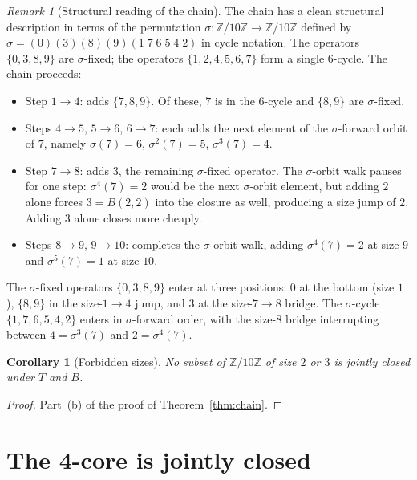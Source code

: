 \documentclass[11pt,reqno]{amsart}
\theoremstyle{plain}
\newtheorem{corollary}[theorem]{Corollary}
\theoremstyle{definition}
\theoremstyle{remark}
\newtheorem*{remark}{Remark}
\newcommand{\Z}{\mathbb{Z}}
\newcommand{\Zten}{\Z/10\Z}
\begin{document}
\begin{remark}[Structural reading of the chain]\label{rem:sigma-walk}
The chain has a clean structural description in terms of the
permutation $\sigma:\Zten\to\Zten$ defined by
$\sigma=(0)(3)(8)(9)(1\;7\;6\;5\;4\;2)$ in cycle notation. The
operators $\{0,3,8,9\}$ are $\sigma$-fixed; the operators
$\{1,2,4,5,6,7\}$ form a single $6$-cycle. The chain proceeds:
\begin{itemize}\setlength\itemsep{0pt}
\item Step $1\to 4$: adds $\{7,8,9\}$. Of these, $7$ is in the
$6$-cycle and $\{8,9\}$ are $\sigma$-fixed.
\item Steps $4\to 5$, $5\to 6$, $6\to 7$: each adds the next
element of the $\sigma$-forward orbit of $7$, namely
$\sigma(7)=6$, $\sigma^{2}(7)=5$, $\sigma^{3}(7)=4$.
\item Step $7\to 8$: adds $3$, the remaining $\sigma$-fixed
operator. The $\sigma$-orbit walk pauses for one step:
$\sigma^{4}(7)=2$ would be the next $\sigma$-orbit element, but
adding $2$ alone forces $3=B(2,2)$ into the closure as well,
producing a size jump of $2$. Adding $3$ alone closes more
cheaply.
\item Steps $8\to 9$, $9\to 10$: completes the $\sigma$-orbit
walk, adding $\sigma^{4}(7)=2$ at size $9$ and
$\sigma^{5}(7)=1$ at size $10$.
\end{itemize}
The $\sigma$-fixed operators $\{0,3,8,9\}$ enter at three
positions: $0$ at the bottom (size $1$), $\{8,9\}$ in the
size-$1\to 4$ jump, and $3$ at the size-$7\to 8$ bridge. The
$\sigma$-cycle $\{1,7,6,5,4,2\}$ enters in $\sigma$-forward order,
with the size-$8$ bridge interrupting between
$4=\sigma^{3}(7)$ and $2=\sigma^{4}(7)$.
\end{remark}

\begin{corollary}[Forbidden sizes]\label{cor:forbidden}
No subset of $\Zten$ of size $2$ or $3$ is jointly closed under
$T$ and $B$.
\end{corollary}

\begin{proof}
Part~(b) of the proof of Theorem~\ref{thm:chain}.
\end{proof}

\section{The 4-core is jointly closed}\label{sec:4core}
\end{document}
